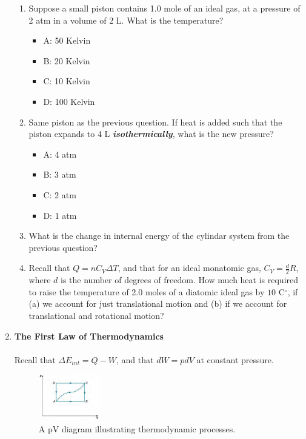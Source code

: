 \documentclass[10pt]{article}
\begin{document}
\begin{enumerate}
\begin{enumerate}
\item Suppose a small piston contains 1.0 mole of an ideal gas, at a pressure of 2 atm in a volume of 2 L.  What is the temperature?
\begin{itemize}
\item A: 50 Kelvin
\item B: 20 Kelvin
\item C: 10 Kelvin
\item D: 100 Kelvin
\end{itemize}
\item Same piston as the previous question.  If heat is added such that the piston expands to 4 L \textbf{\textit{isothermically}}, what is the new pressure?
\begin{itemize}
\item A: 4 atm
\item B: 3 atm
\item C: 2 atm
\item D: 1 atm
\end{itemize}
\item What is the change in internal energy of the cylindar system from the previous question? \\ \vspace{1cm}
\item Recall that $Q = n C_V \Delta T$, and that for an ideal monatomic gas, $C_V = \frac{d}{2}R$, where $d$ is the number of degrees of freedom.  How much heat is required to raise the temperature of 2.0 moles of a diatomic ideal gas by $10$ C$^{\circ}$, if (a) we account for just translational motion and (b) if we account for translational and rotational motion? \\ \vspace{2cm}
\end{enumerate}
\item \textbf{The First Law of Thermodynamics}
\\ \\ Recall that $\Delta E_{int} = Q - W$, and that $dW = p dV$ at constant pressure.
\begin{enumerate}
\begin{figure}
\centering
\includegraphics[width=0.25\textwidth]{figures/pvdiag.png}
\caption{\label{fig:pvdiag} A pV diagram illustrating thermodynamic processes.}

\end{figure}
\end{enumerate}
\end{enumerate}
\end{document}
